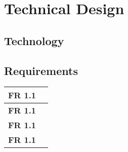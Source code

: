  \section{Technical Design}\label{sec:technical}


  
  \subsection{Technology}

  \subsection{Requirements}

  \begin{table}[H]
    \begin{tabular}{| p{1.5cm} | p{10cm} |}
      \hline
      {\bf FR 1.1} & \\ \hline
      {\bf FR 1.1} & \\ \hline
      {\bf FR 1.1} & \\ \hline
      {\bf FR 1.1} & \\ \hline

    \end{tabular}
  \end{table}